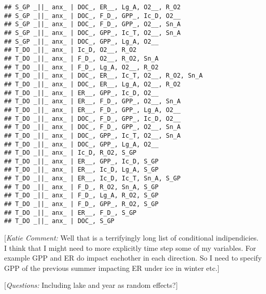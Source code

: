 \documentclass[]{article}
\begin{document}
\begin{verbatim}
## S_GP _||_ anx_ | DOC_, ER__, Lg_A, O2__, R_O2
## S_GP _||_ anx_ | DOC_, F_D_, GPP_, Ic_D, O2__
## S_GP _||_ anx_ | DOC_, F_D_, GPP_, O2__, Sn_A
## S_GP _||_ anx_ | DOC_, GPP_, Ic_T, O2__, Sn_A
## S_GP _||_ anx_ | DOC_, GPP_, Lg_A, O2__
## T_DO _||_ anx_ | Ic_D, O2__, R_O2
## T_DO _||_ anx_ | F_D_, O2__, R_O2, Sn_A
## T_DO _||_ anx_ | F_D_, Lg_A, O2__, R_O2
## T_DO _||_ anx_ | DOC_, ER__, Ic_T, O2__, R_O2, Sn_A
## T_DO _||_ anx_ | DOC_, ER__, Lg_A, O2__, R_O2
## T_DO _||_ anx_ | ER__, GPP_, Ic_D, O2__
## T_DO _||_ anx_ | ER__, F_D_, GPP_, O2__, Sn_A
## T_DO _||_ anx_ | ER__, F_D_, GPP_, Lg_A, O2__
## T_DO _||_ anx_ | DOC_, F_D_, GPP_, Ic_D, O2__
## T_DO _||_ anx_ | DOC_, F_D_, GPP_, O2__, Sn_A
## T_DO _||_ anx_ | DOC_, GPP_, Ic_T, O2__, Sn_A
## T_DO _||_ anx_ | DOC_, GPP_, Lg_A, O2__
## T_DO _||_ anx_ | Ic_D, R_O2, S_GP
## T_DO _||_ anx_ | ER__, GPP_, Ic_D, S_GP
## T_DO _||_ anx_ | ER__, Ic_D, Lg_A, S_GP
## T_DO _||_ anx_ | ER__, Ic_D, Ic_T, Sn_A, S_GP
## T_DO _||_ anx_ | F_D_, R_O2, Sn_A, S_GP
## T_DO _||_ anx_ | F_D_, Lg_A, R_O2, S_GP
## T_DO _||_ anx_ | F_D_, GPP_, R_O2, S_GP
## T_DO _||_ anx_ | ER__, F_D_, S_GP
## T_DO _||_ anx_ | DOC_, S_GP
\end{verbatim}

{ {[}\emph{Katie Comment:} Well that is a terrifyingly long list of
conditional indipendicies. I think that I might need to more explicitly
time step some of my variables. For example GPP and ER do impact
eachother in each direction. So I need to specify GPP of the previous
summer impacting ER under ice in winter etc.{]} }

{ {[}\emph{Questions:} Including lake and year as random effects?{]}}
\end{document}
